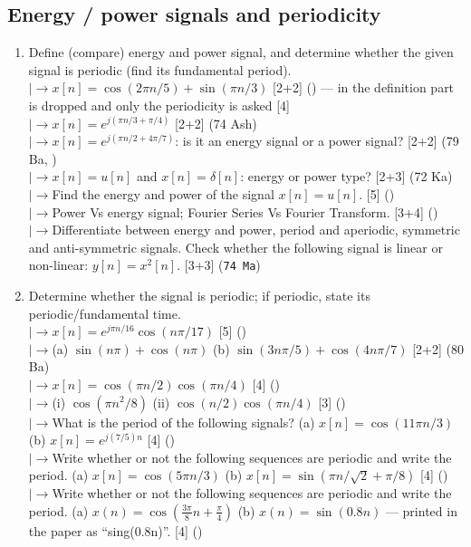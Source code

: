 \documentclass[12pt]{article}
\newcommand{\lb}{\\$\left|\rightarrow\right.$}
\begin{document}
  \subsection{Energy / power signals and periodicity}
    \begin{enumerate}[topsep=0pt, noitemsep]
      \item Define (compare) energy and power signal, and determine whether the given signal is periodic (find its fundamental period).
        \lb $x[n]=\cos(2\pi n/5)+\sin(\pi n/3)$ \hfill [2+2] () --- in  the definition part is dropped and only the periodicity is asked \hfill [4]
        \lb $x[n]=e^{j(\pi n/3+\pi/4)}$ \hfill [2+2] (74 Ash)
        \lb $x[n]=e^{j(\pi n/2+4\pi/7)}$: is it an energy signal or a power signal? \hfill [2+2] (79 Ba, )
        \lb $x[n]=u[n]$ and $x[n]=\delta[n]$: energy or power type? \hfill [2+3] (72 Ka)
        \lb Find the energy and power of the signal $x[n]=u[n]$. \hfill [5] ()
        \lb Power Vs energy signal; Fourier Series Vs Fourier Transform. \hfill [3+4] ()
        \lb Differentiate between energy and power, period and aperiodic, symmetric and anti-symmetric signals. Check whether the following signal is linear or non-linear: $y[n]=x^2[n]$. \hfill [3+3] (\texttt{74 Ma})

      \item Determine whether the signal is periodic; if periodic, state its periodic/fundamental time.
        \lb $x[n]=e^{j\pi n/16}\cos(n\pi/17)$ \hfill [5] ()
        \lb (a) $\sin(n\pi)+\cos(n\pi)$ \quad (b) $\sin(3n\pi/5)+\cos(4n\pi/7)$ \hfill [2+2] (80 Ba)
        \lb $x[n]=\cos(\pi n/2)\cos(\pi n/4)$ \hfill [4] ()
        \lb (i) $\cos(\pi n^2/8)$ \quad (ii) $\cos(n/2)\cos(\pi n/4)$ \hfill [3] ()
        \lb What is the period of the following signals? (a) $x[n]=\cos(11\pi n/3)$ \quad (b) $x[n]=e^{j(7/5)n}$ \hfill [4] ()
        \lb Write whether or not the following sequences are periodic and write the period. (a) $x[n]=\cos(5\pi n/3)$ \quad (b) $x[n]=\sin(\pi n/\sqrt{2}+\pi/8)$ \hfill [4] ()
        \lb Write whether or not the following sequences are periodic and write the period. (a) $x(n)=\cos(\tfrac{3\pi}{8}n+\tfrac{\pi}{4})$ \quad (b) $x(n)=\sin(0.8n)$ --- printed in the paper as ``sing(0.8n)''. \hfill [4] ()
    \end{enumerate}
\end{document}
